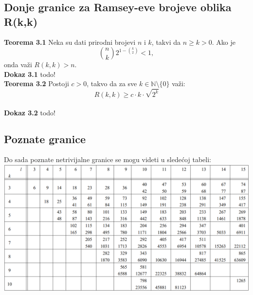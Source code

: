 \documentclass[12pt,a4paper]{article}
\begin{document}
\subsection{Donje granice za Ramsey-eve brojeve oblika R(k,k)}
{\noindent\fontsize{12pt}{12pt}\textbf{Teorema 3.1}}
Neka su dati prirodni brojevi $n$ i $k$, takvi da $n\geq k>0$. Ako je
\[\binom{n}{k}2^{1-\binom{k}{2}}<1,\]
onda važi $R(k,k)>n$.\\
{\noindent\fontsize{12pt}{12pt}\textbf{Dokaz 3.1}} todo!\\
{\noindent\fontsize{12pt}{12pt}\textbf{Teorema 3.2}} Postoji $c>0$, takvo da za sve $k\in \mathbb{N}\setminus\{0\}$ važi:
\[R(k,k)\geq c\cdot k\cdot\sqrt{2^k}\]\\
{\noindent\fontsize{12pt}{12pt}\textbf{Dokaz 3.2}} todo!
\subsection{Poznate granice}
Do sada poznate netrivijalne granice se mogu videti u sledećoj tabeli:\\
\includegraphics[width=\textwidth]{poznateGranice.png} %
\end{document}
